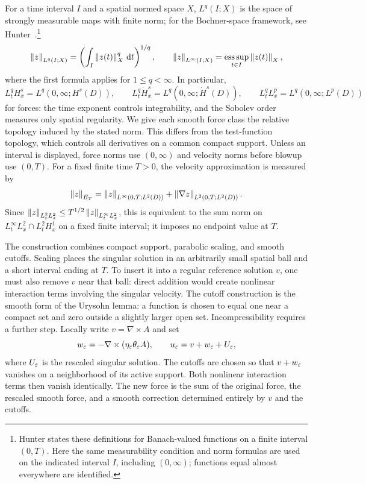 For a time interval $I$ and a spatial normed space $X$, $L^q(I;X)$ is the
space of strongly measurable maps with finite norm; for the Bochner-space
framework, see Hunter~\cite[Appendix~6.A, Definitions~6.14 and~6.27]{hunterpde}.\footnote{Hunter
states these definitions for Banach-valued functions on a finite interval
$(0,T)$. Here the same measurability condition and norm formulas are used
on the indicated interval $I$, including $(0,\infty)$; functions equal
almost everywhere are identified.}
\begin{equation}\label{eq:time-norms}
 \left\lVert z\right\rVert_{L^q(I;X)}=\left(\int_I\left\lVert z(t)\right\rVert_X^q\,\mathrm d t\right)^{1/q},
 \qquad
 \left\lVert z\right\rVert_{L^\infty(I;X)}=\operatorname*{ess\,sup}_{t\in I}\left\lVert z(t)\right\rVert_X,
\end{equation}
where the first formula applies for $1\le q<\infty$. In particular,
\[
 L^q_tH^s_x=L^q(0,\infty;H^s(D)),\qquad
 L^q_t\dot H^s_x=L^q(0,\infty;\dot H^s(D)),\qquad
 L^q_tL^p_x=L^q(0,\infty;L^p(D))
\]
for forces: the time exponent controls integrability, and the Sobolev
order measures only spatial regularity. We give each smooth force class
the relative topology induced by the stated norm. This differs from the
test-function topology, which controls all derivatives on a common compact
support. Unless an interval is displayed, force norms use $(0,\infty)$
and velocity norms before blowup use $(0,T)$. For a fixed finite time
$T>0$, the velocity approximation is measured by
\begin{equation}\label{eq:Enorm}
 \left\lVert z\right\rVert_{E_T}=\left\lVert z\right\rVert_{L^\infty(0,T;L^2(D))}
                +\left\lVert\nabla z\right\rVert_{L^2(0,T;L^2(D))}.
\end{equation}
Since $\left\lVert z\right\rVert_{L^2_tL^2_x}\le T^{1/2}\left\lVert z\right\rVert_{L^\infty_tL^2_x}$,
this is equivalent to the sum norm on
$L^\infty_tL^2_x\cap L^2_tH^1_x$ on a fixed finite interval; it imposes
no endpoint value at $T$.

The construction combines compact support, parabolic scaling, and smooth
cutoffs. Scaling places the singular solution in an arbitrarily small
spatial ball and a short interval ending at $T$. To insert it into a
regular reference solution $v$, one must also remove $v$ near that ball:
direct addition would create nonlinear interaction terms involving the
singular velocity. The cutoff construction is the smooth form of the
Urysohn lemma: a function is chosen to equal one near a compact set and
zero outside a slightly larger open set. Incompressibility requires a
further step. Locally write $v=\nabla\times A$ and set
\[
 w_\varepsilon=-\nabla\times(\eta_\varepsilon\theta_\varepsilon A),
 \qquad u_\varepsilon=v+w_\varepsilon+U_\varepsilon,
\]
where $U_\varepsilon$ is the rescaled singular solution. The cutoffs are chosen
so that $v+w_\varepsilon$ vanishes on a neighborhood of its active support.
Both nonlinear interaction terms then vanish identically. The new force
is the sum of the original force, the rescaled smooth force, and a smooth
correction determined entirely by $v$ and the cutoffs.

